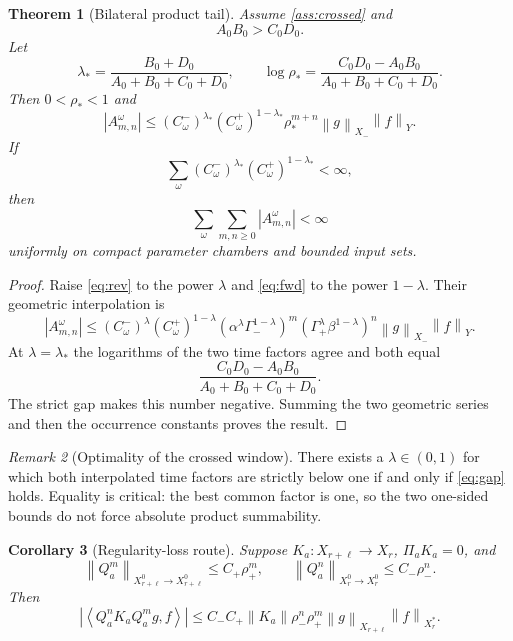 \documentclass[11pt,reqno]{amsart}
\newtheorem{theorem}{Theorem}[section]
\newtheorem{corollary}[theorem]{Corollary}
\theoremstyle{definition}
\theoremstyle{remark}
\newtheorem{remark}[theorem]{Remark}
\newcommand{\norm}[1]{\left\lVert #1\right\rVert}
\newcommand{\abs}[1]{\left\lvert #1\right\rvert}
\newcommand{\pair}[2]{\left\langle #1,#2\right\rangle}
\begin{document}
\begin{theorem}[Bilateral product tail]\label{thm:bilateral}
Assume \cref{ass:crossed} and
\begin{equation}\label{eq:gap}
 A_0B_0>C_0D_0.
\end{equation}
Let
\[
 \lambda_*=
 \frac{B_0+D_0}{A_0+B_0+C_0+D_0},
 \qquad
 \log\rho_*=
 \frac{C_0D_0-A_0B_0}{A_0+B_0+C_0+D_0}.
\]
Then $0<\rho_*<1$ and
\begin{equation}\label{eq:prod}
 \abs{A_{m,n}^{\omega}}
 \le (C_\omega^-)^{\lambda_*}
      (C_\omega^+)^{1-\lambda_*}
      \rho_*^{m+n}\norm{g}_{X_-}\norm{f}_{Y}.
\end{equation}
If
\[
 \sum_\omega (C_\omega^-)^{\lambda_*}
                    (C_\omega^+)^{1-\lambda_*}<\infty,
\]
then
\[
 \sum_\omega\sum_{m,n\ge0}
 \abs{A_{m,n}^{\omega}}<\infty
\]
uniformly on compact parameter chambers and bounded input sets.
\end{theorem}

\begin{proof}
Raise \eqref{eq:rev} to the power $\lambda$ and \eqref{eq:fwd} to the
power $1-\lambda$.  Their geometric interpolation is
\[
 \abs{A_{m,n}^{\omega}}
 \le (C_\omega^-)^\lambda(C_\omega^+)^{1-\lambda}
 (\alpha^\lambda\Gamma_-^{1-\lambda})^m
 (\Gamma_+^\lambda\beta^{1-\lambda})^n
 \norm{g}_{X_-}\norm{f}_{Y}.
\]
At $\lambda=\lambda_*$ the logarithms of the two time factors agree and
both equal
\[
 \frac{C_0D_0-A_0B_0}{A_0+B_0+C_0+D_0}.
\]
The strict gap makes this number negative.  Summing the two geometric series
and then the occurrence constants proves the result.
\end{proof}

\begin{remark}[Optimality of the crossed window]
There exists a $\lambda\in(0,1)$ for which both interpolated time factors are
strictly below one if and only if \eqref{eq:gap} holds.  Equality is critical:
the best common factor is one, so the two one-sided bounds do not force
absolute product summability.
\end{remark}

\begin{corollary}[Regularity-loss route]\label{cor:loss}
Suppose $K_a:X_{r+\ell}\to X_r$, $\Pi_aK_a=0$, and
\[
 \norm{Q_a^m}_{X_{r+\ell}^0\to X_{r+\ell}^0}
 \le C_+\rho_+^m,
 \qquad
 \norm{Q_a^n}_{X_r^0\to X_r^0}
 \le C_-\rho_-^n.
\]
Then
\[
 \abs{\pair{Q_a^nK_aQ_a^m g}{f}}
 \le C_-C_+\norm{K_a}\rho_-^n\rho_+^m
      \norm{g}_{X_{r+\ell}}\norm{f}_{X_r^*}.
\]
\end{corollary}
\end{document}
